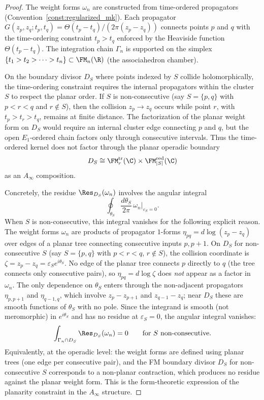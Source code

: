 \begin{proof}
The weight forms $\omega_n$ are constructed from time-ordered propagators (Convention~\ref{const:regularized_mk}). Each propagator $G(z_p, z_q; t_p, t_q) = \Theta(t_p - t_q)/(2\pi(z_p - z_q))$ connects points $p$ and $q$ with the time-ordering constraint $t_p > t_q$ enforced by the Heaviside function $\Theta(t_p - t_q)$. The integration chain $\Gamma_n$ is supported on the simplex $\{t_1 > t_2 > \cdots > t_n\} \subset \FM_n(\R)$ (the associahedron chamber).

On the boundary divisor \(D_S\) where points indexed by \(S\) collide
holomorphically, the time-ordering constraint requires the internal
propagators within the cluster \(S\) to respect the planar order. If
\(S\) is non-consecutive (say \(S=\{p,q\}\) with \(p<r<q\) and
\(r\notin S\)), then the collision \(z_p\to z_q\) occurs while point
\(r\), with \(t_p>t_r>t_q\), remains at finite distance. The
factorization of the planar weight form on \(D_S\) would require an
internal cluster edge connecting \(p\) and \(q\), but the open
\(E_1\)-ordered chain factors only through consecutive intervals. Thus
the time-ordered kernel does not factor through the planar operadic
boundary
\[
D_S\cong \FM_r^{\mathrm{tr}}(\C)\times
\FM_{|S|}^{\mathrm{red}}(\C)
\]
as an \(A_\infty\) composition.

Concretely, the residue $\Res_{D_S}(\omega_n)$ involves the angular integral
\[
\oint_{\theta_S} \frac{d\theta_S}{2\pi}\, \omega_n\big|_{\varepsilon_S = 0}.
\]
When $S$ is non-consecutive, this integral vanishes for the following explicit reason. The weight forms $\omega_n$ are products of propagator $1$-forms $\eta_{pq} = d\log(z_p - z_q)$ over edges of a planar tree connecting consecutive inputs $p, p{+}1$. On $D_S$ for non-consecutive $S$ (say $S = \{p,q\}$ with $p < r < q$, $r \notin S$), the collision coordinate is $\zeta = z_p - z_q = \varepsilon_S e^{i\theta_S}$. No edge of the planar tree connects $p$ directly to $q$ (the tree connects only consecutive pairs), so $\eta_{pq} = d\log\zeta$ does \emph{not} appear as a factor in $\omega_n$. The only dependence on $\theta_S$ enters through the non-adjacent propagators $\eta_{p,p+1}$ and $\eta_{q-1,q}$, which involve $z_p - z_{p+1}$ and $z_{q-1} - z_q$; near $D_S$ these are smooth functions of $\theta_S$ with no pole. Since the integrand is smooth (not meromorphic) in $e^{i\theta_S}$ and has no residue at $\varepsilon_S = 0$, the angular integral vanishes:
\[
\int_{\Gamma_n \cap D_S} \Res_{D_S}(\omega_n) = 0 \qquad \text{for } S \text{ non-consecutive}.
\]
Equivalently, at the operadic level: the weight forms are defined using planar trees (one edge per consecutive pair), and the FM boundary divisor $D_S$ for non-consecutive $S$ corresponds to a non-planar contraction, which produces no residue against the planar weight form. This is the form-theoretic expression of the planarity constraint in the $A_\infty$ structure.


\end{proof}
